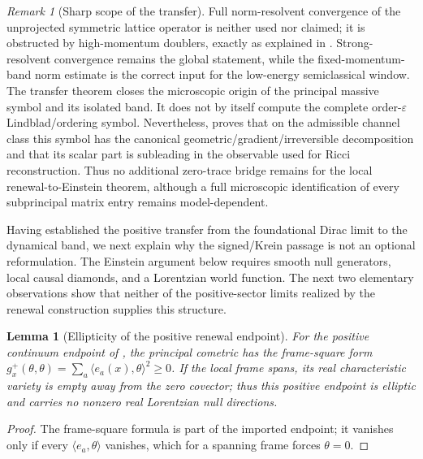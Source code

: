 \documentclass[11pt]{article}
\newtheorem{lemma}[theorem]{Lemma}
\theoremstyle{definition}
\theoremstyle{remark}
\newtheorem{remark}[theorem]{Remark}
\newcommand{\eps}{\varepsilon}
\begin{document}
\begin{remark}[Sharp scope of the transfer]
\label{rem:transfer-scope}
Full norm-resolvent convergence of the unprojected symmetric lattice operator is
neither used nor claimed; it is obstructed by high-momentum doublers, exactly as
explained in \cite{PelissierLorentzian}.  Strong-resolvent convergence remains
the global statement, while the fixed-momentum-band norm estimate is the correct
input for the low-energy semiclassical window.  The transfer theorem closes the microscopic origin of the principal massive
symbol and its isolated band.  It does not by itself compute the complete
order-\(\eps\) Lindblad/ordering symbol.  Nevertheless,
 proves that on the admissible
channel class this symbol has the canonical geometric/gradient/irreversible
decomposition and that its scalar part is subleading in the observable used for
Ricci reconstruction.  Thus no additional zero-trace bridge remains for the
local renewal-to-Einstein theorem, although a full microscopic identification
of every subprincipal matrix entry remains model-dependent.
\end{remark}

Having established the positive transfer from the foundational Dirac limit to
the dynamical band, we next explain why the signed/Krein passage is not an
optional reformulation.  The Einstein argument below requires smooth null
generators, local causal diamonds, and a Lorentzian world function.  The next
two elementary observations show that neither of the positive-sector limits
realized by the renewal construction supplies this structure.

\begin{lemma}[Ellipticity of the positive renewal endpoint]
\label{lem:cp-elliptic}
For the positive continuum endpoint of \cite{PelissierLorentzian}, the principal
cometric has the frame-square form
$g_x^+(\theta,\theta)=\sum_a\langle e_a(x),\theta\rangle^2\ge0$.  If the local
frame spans, its real characteristic variety is empty away from the zero
covector; thus this positive endpoint is elliptic and carries no nonzero real
Lorentzian null directions.
\end{lemma}

\begin{proof}
The frame-square formula is part of the imported endpoint; it vanishes only if
every $\langle e_a,\theta\rangle$ vanishes, which for a spanning frame forces
$\theta=0$.
\end{proof}
\end{document}
